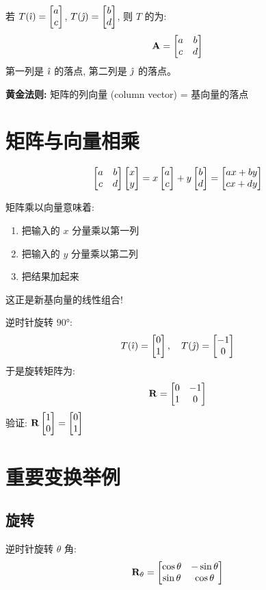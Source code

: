 \begin{definition}
若 $T(\hat{\imath}) = \begin{bmatrix} a \\ c \end{bmatrix}$, $T(\hat{\jmath}) = \begin{bmatrix} b \\ d \end{bmatrix}$, 则 $T$ 的为:
\[
\mathbf{A} = \begin{bmatrix} a & b \\ c & d \end{bmatrix}
\]
第一列是 $\hat{\imath}$ 的落点, 第二列是 $\hat{\jmath}$ 的落点。
\end{definition}

\begin{important}
\textbf{黄金法则:} 矩阵的列向量 (column vector) = 基向量的落点
\end{important}

\section{矩阵与向量相乘}

\begin{definition}[矩阵乘以向量]
\[
\begin{bmatrix} a & b \\ c & d \end{bmatrix} \begin{bmatrix} x \\ y \end{bmatrix} = x\begin{bmatrix} a \\ c \end{bmatrix} + y\begin{bmatrix} b \\ d \end{bmatrix} = \begin{bmatrix} ax + by \\ cx + dy \end{bmatrix}
\]
\end{definition}

\begin{intuition}
矩阵乘以向量意味着:
\begin{enumerate}
    \item 把输入的 $x$ 分量乘以第一列
    \item 把输入的 $y$ 分量乘以第二列
    \item 把结果加起来
\end{enumerate}
这正是新基向量的线性组合!
\end{intuition}

\begin{example}
逆时针旋转 $90°$:
\[
T(\hat{\imath}) = \begin{bmatrix} 0 \\ 1 \end{bmatrix}, \quad T(\hat{\jmath}) = \begin{bmatrix} -1 \\ 0 \end{bmatrix}
\]
于是旋转矩阵为:
\[
\mathbf{R} = \begin{bmatrix} 0 & -1 \\ 1 & 0 \end{bmatrix}
\]
验证: $\mathbf{R}\begin{bmatrix} 1 \\ 0 \end{bmatrix} = \begin{bmatrix} 0 \\ 1 \end{bmatrix}$ \checkmark
\end{example}

\section{重要变换举例}

\subsection{旋转}

\begin{definition}[旋转矩阵]
逆时针旋转 $\theta$ 角:
\[
\mathbf{R}_\theta = \begin{bmatrix} \cos\theta & -\sin\theta \\ \sin\theta & \cos\theta \end{bmatrix}
\]
\end{definition}

